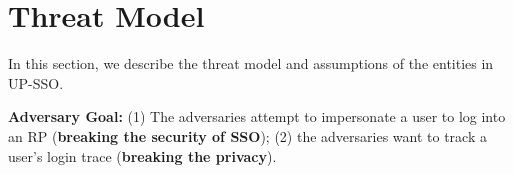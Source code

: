 \section{Threat Model}
\label{sec:threatmodel}

In this section, we describe the threat model and assumptions of the entities in UP-SSO.

\vspace{1mm}\noindent\textbf{Adversary Goal:} (1) The adversaries attempt to impersonate a user to log into an RP (\textbf{breaking the  security of SSO}); (2) the adversaries want to track a user's login trace (\textbf{breaking the privacy}).
\begin{comment}
\item \noindent\textbf{Breaking the security. }The adversaries can impersonate an honest user to log in to the honest RP.
\item \noindent\textbf{Breaking the privacy. }The adversaries can track a user's login trace on each RP.
\end{comment}

